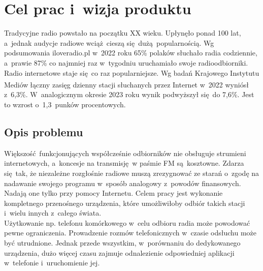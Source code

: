 \documentclass[polish]{aghengthesis}
\author{Norbert Morawski}
\date{\the\year}
\begin{document}
\lstset{inputencoding=utf8, basicstyle=\ttfamily}

\maketitle

\tableofcontents

\chapter{Cel prac i~wizja produktu}

	Tradycyjne radio powstało na początku XX wieku. Upłynęło ponad 100 lat, a~jednak audycje radiowe wciąż cieszą się dużą popularnością. Wg podsumowania iloveradio.pl\textsuperscript{\cite{iloveradio_stats}} w~2022 roku 65\% polaków słuchało radia codziennie, a~prawie 87\% co najmniej raz w~tygodniu uruchamiało swoje radioodbiorniki. 
	$ $\\
	
	Radio internetowe staje się co raz popularniejsze. Wg badań Krajowego Instytutu Mediów\textsuperscript{\cite{kim_2022} \cite{kim_2023}} łączny zasięg dzienny stacji słuchanych przez Internet w~2022 wyniósł z~6,3\%. W~analogicznym okresie 2023 roku wynik podwyższył się do 7,6\%. Jest to wzrost o~1,3~punków procentowych.
	
	\section{Opis problemu}
		Większość funkcjonujących współcześnie odbiorników nie obsługuje strumieni internetowych, a~koncesje na transmisję w paśmie FM są kosztowne. Zdarza się tak, że niezależne rozgłośnie radiowe muszą zrezygnować ze starań o~zgodę na nadawanie swojego programu w~sposób analogowy\textsuperscript{\cite{r357_krrit}} z~powodów finansowych.
		Nadają one tylko przy pomocy Internetu.
		Celem pracy jest wykonanie kompletnego przenośnego urządzenia, które umożliwiłoby odbiór takich stacji i~wielu innych z~całego świata.
		$ $\\
		
		Użytkowanie np. telefonu komórkowego w~celu odbioru radia może powodować pewne ograniczenia. Prowadzenie rozmów telefonicznych w~czasie odsłuchu może być utrudnione. Jednak przede wszystkim, w~porównaniu do dedykowanego urządzenia, dużo więcej czasu zajmuje odnalezienie odpowiedniej aplikacji w~telefonie i~uruchomienie jej.
		
\end{document}
